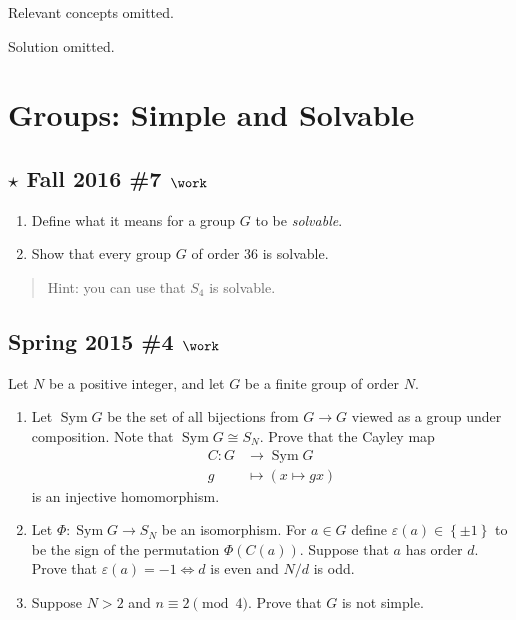 Relevant concepts omitted.

Solution omitted.

\hypertarget{groups-simple-and-solvable}{%
\section{Groups: Simple and Solvable}\label{groups-simple-and-solvable}}

\hypertarget{star-fall-2016-7-work}{%
\subsection{\texorpdfstring{\(\star\) Fall 2016 \#7
\(\work\)}{\textbackslash star Fall 2016 \#7 \textbackslash work}}\label{star-fall-2016-7-work}}

\begin{enumerate}
\def\labelenumi{\alph{enumi}.}
\item
  Define what it means for a group \(G\) to be \emph{solvable}.
\item
  Show that every group \(G\) of order 36 is solvable.
\end{enumerate}

\begin{quote}
Hint: you can use that \(S_4\) is solvable.
\end{quote}

\hypertarget{spring-2015-4-work}{%
\subsection{\texorpdfstring{Spring 2015 \#4
\(\work\)}{Spring 2015 \#4 \textbackslash work}}\label{spring-2015-4-work}}

Let \(N\) be a positive integer, and let \(G\) be a finite group of
order \(N\).

\begin{enumerate}
\def\labelenumi{\alph{enumi}.}
\item
  Let \(\operatorname{Sym}G\) be the set of all bijections from
  \(G\to G\) viewed as a group under composition. Note that
  \(\operatorname{Sym}G \cong S_N\). Prove that the Cayley map
  \begin{align*}
  C: G&\to \operatorname{Sym}G\\
  g &\mapsto (x\mapsto gx)
  \end{align*}
  is an injective homomorphism.
\item
  Let \(\Phi: \operatorname{Sym}G\to S_N\) be an isomorphism. For
  \(a\in G\) define \({\varepsilon}(a) \in \left\{{\pm 1}\right\}\) to
  be the sign of the permutation \(\Phi(C(a))\). Suppose that \(a\) has
  order \(d\). Prove that \({\varepsilon}(a) = -1 \iff d\) is even and
  \(N/d\) is odd.
\item
  Suppose \(N> 2\) and \(n\equiv 2 \pmod 4\). Prove that \(G\) is not
  simple.
\end{enumerate}

